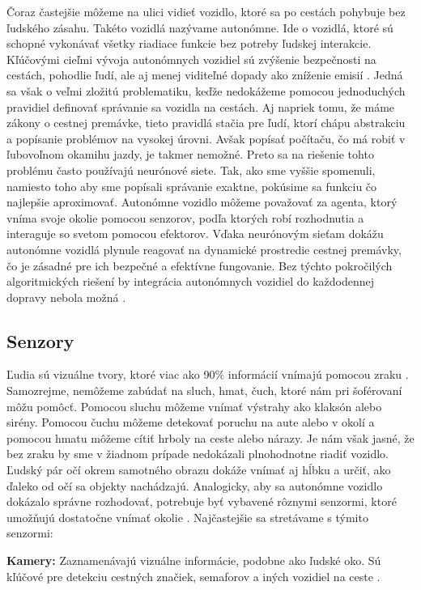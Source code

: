 Čoraz častejšie môžeme na ulici vidieť vozidlo, ktoré sa po cestách pohybuje bez ľudského zásahu. Takéto vozidlá nazývame autonómne. Ide o vozidlá, ktoré sú schopné vykonávať všetky riadiace funkcie bez potreby ľudskej interakcie. Kľúčovými cieľmi vývoja autonómnych vozidiel sú zvýšenie bezpečnosti na cestách, pohodlie ľudí, ale aj menej viditeľné dopady ako zníženie emisií \cite{autonomous_vehicle_goals}. Jedná sa však o veľmi zložitú problematiku, keďže nedokážeme pomocou jednoduchých pravidiel definovať správanie sa vozidla na cestách. Aj napriek tomu, že máme zákony o cestnej premávke, tieto pravidlá stačia pre ľudí, ktorí chápu abstrakciu a popísanie problémov na vysokej úrovni. Avšak popísať počítaču, čo má robiť v ľubovoľnom okamihu jazdy, je takmer nemožné. Preto sa na riešenie tohto problému často používajú neurónové siete. Tak, ako sme vyššie spomenuli, namiesto toho aby sme popísali správanie exaktne, pokúsime sa funkciu čo najlepšie aproximovať. Autonómne vozidlo môžeme považovať za agenta, ktorý vníma svoje okolie pomocou senzorov, podľa ktorých robí rozhodnutia a interaguje so svetom pomocou efektorov. Vďaka neurónovým sieťam dokážu autonómne vozidlá plynule reagovať na dynamické prostredie cestnej premávky, čo je zásadné pre ich bezpečné a efektívne fungovanie. Bez týchto pokročilých algoritmických riešení by integrácia autonómnych vozidiel do každodennej dopravy nebola možná \cite{autonomous_vehicle_goals}.

\subsection{Senzory}

Ľudia sú vizuálne tvory, ktoré viac ako 90\% informácií vnímajú pomocou zraku \cite{gregory1979eye}. Samozrejme, nemôžeme zabúdať na sluch, hmat, čuch, ktoré nám pri šoférovaní môžu pomôcť. Pomocou sluchu môžeme vnímať výstrahy ako klaksón alebo sirény. Pomocou čuchu môžeme detekovať poruchu na aute alebo v okolí a pomocou hmatu môžeme cítiť hrboly na ceste alebo nárazy. Je nám však jasné, že bez zraku by sme v žiadnom prípade nedokázali plnohodnotne riadiť vozidlo. Ľudský pár očí okrem samotného obrazu dokáže vnímať aj hĺbku a určiť, ako ďaleko od očí sa objekty nachádzajú. Analogicky, aby sa autonómne vozidlo dokázalo správne rozhodovať, potrebuje byť vybavené rôznymi senzormi, ktoré umožňujú dostatočne vnímať okolie \cite{end_to_end_self_driving}. Najčastejšie sa stretávame s týmito senzormi:

\textbf{Kamery:} Zaznamenávajú vizuálne informácie, podobne ako ľudské oko. Sú kľúčové pre detekciu cestných značiek, semaforov a iných vozidiel na ceste \cite{end_to_end_self_driving}.

